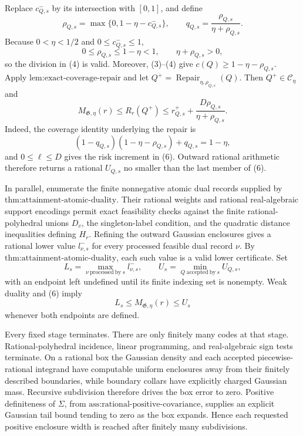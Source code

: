 Replace \(c^-_{Q,s}\) by its intersection with \([0,1]\), and define
\[
 \rho_{Q,s}=\max\{0,1-\eta-c^-_{Q,s}\},
 \qquad
 q_{Q,s}=\frac{\rho_{Q,s}}{\eta+\rho_{Q,s}}.
 \tag{4}
\]
Because \(0<\eta<1/2\) and \(0\le c^-_{Q,s}\le1\),
\[
 0\le\rho_{Q,s}\le1-\eta<1,
 \qquad \eta+\rho_{Q,s}>0,
 \tag{5}
\]
so the division in (4) is valid.  Moreover, (3)--(4) give \(c(Q)\ge1-\eta-\rho_{Q,s}\).  Apply \(\text{lem:exact-coverage-repair}\) and let \(Q^+=\operatorname{Repair}_{\eta,\rho_{Q,s}}(Q)\).  Then \(Q^+\in\mathcal C_\eta\) and
\[
 M_{\mathfrak G,\eta}(r)
 \le R_r(Q^+)
 \le r^+_{Q,s}+\frac{D\rho_{Q,s}}{\eta+\rho_{Q,s}}.
 \tag{6}
\]
Indeed, the coverage identity underlying the repair is
\[
 \left(1-q_{Q,s}\right)(1-\eta-\rho_{Q,s})+q_{Q,s}=1-\eta,
 \tag{7}
\]
and \(0\le\ell\le D\) gives the risk increment in (6).  Outward rational arithmetic therefore returns a rational \(U_{Q,s}\) no smaller than the last member of (6).

In parallel, enumerate the finite nonnegative atomic dual records supplied by \(\text{thm:attainment-atomic-duality}\).  Their rational weights and rational real-algebraic support encodings permit exact feasibility checks against the finite rational-polyhedral unions \(D_v\), the singleton-label condition, and the quadratic distance inequalities defining \(H_r\).  Refining the outward Gaussian enclosures gives a rational lower value \(l^-_{\nu,s}\) for every processed feasible dual record \(\nu\).  By \(\text{thm:attainment-atomic-duality}\), each such value is a valid lower certificate.  Set
\[
 L_s=\max_{\nu\ \mathrm{processed\ by}\ s}l^-_{\nu,s},
 \qquad
 U_s=\min_{Q\ \mathrm{accepted\ by}\ s}U_{Q,s},
 \tag{8}
\]
with an endpoint left undefined until its finite indexing set is nonempty.  Weak duality and (6) imply
\[
 L_s\le M_{\mathfrak G,\eta}(r)\le U_s
 \tag{9}
\]
whenever both endpoints are defined.

Every fixed stage terminates.  There are only finitely many codes at that stage.  Rational-polyhedral incidence, linear programming, and real-algebraic sign tests terminate.  On a rational box the Gaussian density and each accepted piecewise-rational integrand have computable uniform enclosures away from their finitely described boundaries, while boundary collars have explicitly charged Gaussian mass.  Recursive subdivision therefore drives the box error to zero.  Positive definiteness of \(\Sigma\), from \(\text{ass:rational-positive-covariance}\), supplies an explicit Gaussian tail bound tending to zero as the box expands.  Hence each requested positive enclosure width is reached after finitely many subdivisions.

